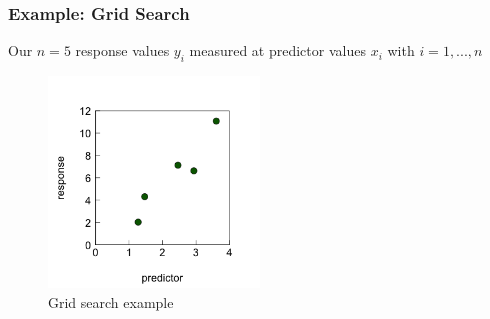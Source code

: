 \documentclass{beamer}
\begin{document}
\begin{frame}
    \frametitle{Example: Grid Search}
    Our $n = 5$ response values $y_i$ measured at predictor values $x_i$ with $i = 1,...,n$
    
    \begin{figure}[h]
        \centering
        \includegraphics[width=0.5\textwidth]{lectures/day_2_LM_refresh_I/figures/unnamed-chunk-22-1.png} 
        \caption{Grid search example}
    \end{figure}
\end{frame}
\end{document}
